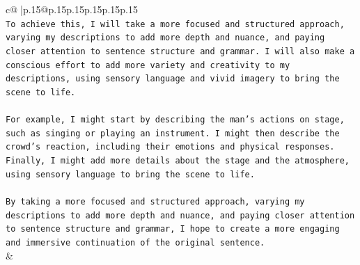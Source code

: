 \documentclass{article}
\begin{document}
{\begin{supertabular}{c@{$\;$}|p{.15\linewidth}@{}p{.15\linewidth}p{.15\linewidth}p{.15\linewidth}p{.15\linewidth}p{.15\linewidth}}
{{{\\ 
\texttt{To achieve this, I will take a more focused and structured approach, varying my descriptions to add more depth and nuance, and paying closer attention to sentence structure and grammar. I will also make a conscious effort to add more variety and creativity to my descriptions, using sensory language and vivid imagery to bring the scene to life.} \\
\\ 
\texttt{For example, I might start by describing the man's actions on stage, such as singing or playing an instrument. I might then describe the crowd's reaction, including their emotions and physical responses. Finally, I might add more details about the stage and the atmosphere, using sensory language to bring the scene to life.} \\
\\ 
\texttt{By taking a more focused and structured approach, varying my descriptions to add more depth and nuance, and paying closer attention to sentence structure and grammar, I hope to create a more engaging and immersive continuation of the original sentence.} \\
            }
        }
    }
    & \\ \\

\end{supertabular}
}
\end{document}
